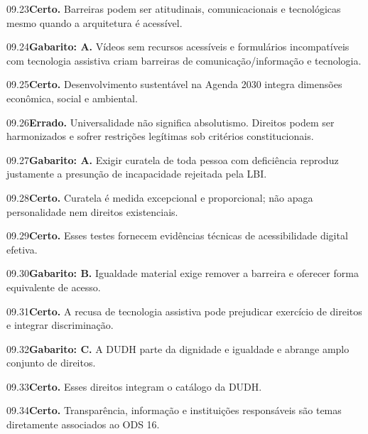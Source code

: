 \begin{solucao}{09.23}\textbf{Certo.} Barreiras podem ser atitudinais, comunicacionais e tecnológicas mesmo quando a arquitetura é acessível.\end{solucao}
\begin{solucao}{09.24}\textbf{Gabarito: A.} Vídeos sem recursos acessíveis e formulários incompatíveis com tecnologia assistiva criam barreiras de comunicação/informação e tecnologia.\end{solucao}
\begin{solucao}{09.25}\textbf{Certo.} Desenvolvimento sustentável na Agenda 2030 integra dimensões econômica, social e ambiental.\end{solucao}

\begin{solucao}{09.26}\textbf{Errado.} Universalidade não significa absolutismo. Direitos podem ser harmonizados e sofrer restrições legítimas sob critérios constitucionais.\end{solucao}
\begin{solucao}{09.27}\textbf{Gabarito: A.} Exigir curatela de toda pessoa com deficiência reproduz justamente a presunção de incapacidade rejeitada pela LBI.\end{solucao}
\begin{solucao}{09.28}\textbf{Certo.} Curatela é medida excepcional e proporcional; não apaga personalidade nem direitos existenciais.\end{solucao}
\begin{solucao}{09.29}\textbf{Certo.} Esses testes fornecem evidências técnicas de acessibilidade digital efetiva.\end{solucao}
\begin{solucao}{09.30}\textbf{Gabarito: B.} Igualdade material exige remover a barreira e oferecer forma equivalente de acesso.\end{solucao}
\begin{solucao}{09.31}\textbf{Certo.} A recusa de tecnologia assistiva pode prejudicar exercício de direitos e integrar discriminação.\end{solucao}
\begin{solucao}{09.32}\textbf{Gabarito: C.} A DUDH parte da dignidade e igualdade e abrange amplo conjunto de direitos.\end{solucao}
\begin{solucao}{09.33}\textbf{Certo.} Esses direitos integram o catálogo da DUDH.\end{solucao}
\begin{solucao}{09.34}\textbf{Certo.} Transparência, informação e instituições responsáveis são temas diretamente associados ao ODS 16.\end{solucao}
